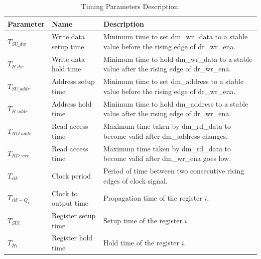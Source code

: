 \begin{table}
\begin{center}
\begin{tabu} to \textwidth {|X[l]|X[l]|X[3,l]|}
\hline
\rowfont[c]\bfseries
\textbf{Parameter} & \textbf{Name} & \textbf{Description}\\
\hline
\hline
$T_{SU\_dw}$   & Write data setup time     & Minimum time to set dm\_wr\_data to a stable value before the rising edge of dr\_wr\_ena.\\
\hline
$T_{H\_dw}$    & Write data hold time      & Minimum time to hold dm\_wr\_data to a stable value after the rising edge of dr\_wr\_ena.\\
\hline
$T_{SU\_addr}$ & Address setup time        & Minimum time to set dm\_address to a stable value before the rising edge of dr\_wr\_ena.\\
\hline
$T_{H\_addr}$  & Address hold time         & Minimum time to hold dm\_address to a stable value after the rising edge of dr\_wr\_ena.\\
\hline
$T_{RD\_addr}$ & Read access time          & Maximum time taken by dm\_rd\_data to become valid after dm\_address changes.\\
\hline
$T_{RD\_wre}$  & Read access time          & Maximum time taken by dm\_rd\_data to become valid after dm\_wr\_ena goes low.\\
\hline
$T_{clk}$      & Clock period              & Period of time between two consecutive rising edges of clock signal.\\
\hline
$T_{clk-Q_i}$  & Clock to output time      & Propagation time of the register $i$.\\
\hline
$T_{SUi}$      & Register setup time       & Setup time of the register $i$.\\
\hline
$T_{Hi}$       & Register hold time        & Hold time of the register $i$.\\
\hline
\end{tabu}
\end{center}
\caption{Timing Parameters Description.}
\label{tbl:timing_paramerters}
\end{table}
